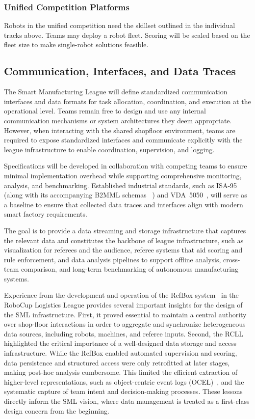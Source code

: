 \documentclass[letterpaper, 11pt]{extarticle}
\begin{document}
\subsubsection{Unified Competition Platforms}
Robots in the unified competition need the skillset outlined in the individual tracks above.
Teams may deploy a robot fleet.%
Scoring will be scaled based on the fleet size to make single-robot solutions feasible.

\subsection{Communication, Interfaces, and Data Traces}

The Smart Manufacturing League will define standardized communication interfaces and data formats for task allocation, coordination, and execution at the operational level.
Teams remain free to design and use any internal communication mechanisms or system architectures they deem appropriate.
However, when interacting with the shared shopfloor environment, teams are required to expose standardized interfaces and communicate explicitly with the league infrastructure to enable coordination, supervision, and logging.

Specifications will be developed in collaboration with competing teams to ensure minimal implementation overhead while supporting comprehensive monitoring, analysis, and benchmarking.
Established industrial standards, such as ISA-95~\citep{isa95} (along with its accompanying B2MML schemas ~\citep{b2mml}) and VDA~5050~\citep{vda5050}, will serve as a baseline to ensure that collected data traces and interfaces align with modern smart factory requirements.


The goal is to provide a data streaming and storage infrastructure that captures the relevant data and constitutes the backbone of league infrastructure, such as visualization for referees and the audience, referee systems that aid scoring and rule enforcement, and data analysis pipelines to support offline analysis, cross-team comparison, and long-term benchmarking of autonomous manufacturing systems.

Experience from the development and operation of the RefBox system~\citep{refbox16} in the RoboCup Logistics League provides several important insights for the design of the SML infrastructure.
First, it proved essential to maintain a central authority over shop-floor interactions in order to aggregate and synchronize heterogeneous data sources, including robots, machines, and referee inputs.
Second, the RCLL highlighted the critical importance of a well-designed data storage and access infrastructure.
While the RefBox enabled automated supervision and scoring, data persistence and structured access were only retrofitted at later stages, making post-hoc analysis cumbersome.
This limited the efficient extraction of higher-level representations, such as object-centric event logs (OCEL)~\citep{ocel21}, and the systematic capture of team intent and decision-making processes.
These lessons directly inform the SML vision, where data management is treated as a first-class design concern from the beginning.
\end{document}

